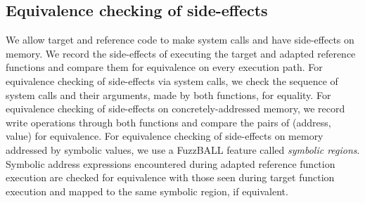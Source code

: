 \subsection{Equivalence checking of side-effects}
\label{sec:eqchk-syscall}
We allow target and reference code to make system calls and have side-effects on memory.
%
We record the side-effects of executing the target and adapted reference functions and compare them for equivalence on every execution path.
%
For equivalence checking of side-effects via system calls, we check the sequence of system calls and their arguments, made by both functions, for equality.
%
For equivalence checking of side-effects on concretely-addressed memory, we record write operations through both functions and compare the pairs of (address, value) for equivalence.
%
For equivalence checking of side-effects on memory addressed by symbolic values, we use a FuzzBALL feature called \textit{symbolic regions}. 
%
Symbolic address expressions encountered during adapted reference function execution are checked for equivalence with those seen during target function execution and mapped to the same symbolic region, if equivalent.
%

